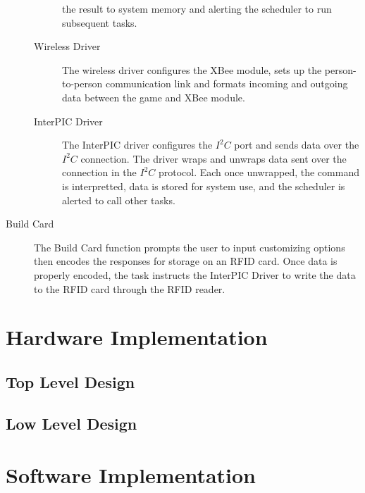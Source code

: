 \documentclass[12pt]{article} %
\begin{document}
\begin{description}
\begin{description}
				the result to system memory and alerting the scheduler to run
				subsequent tasks.
			\item[Wireless Driver] The wireless driver configures the XBee module,
				sets up the person-to-person communication link and formats incoming
				and outgoing data between the game and XBee module.
			\item[InterPIC Driver] The InterPIC driver configures the $I^2C$ port and
				sends data over the $I^2C$ connection. The driver wraps and unwraps
				data sent over the connection in the $I^2C$ protocol. Each once
				unwrapped, the command is interpretted, data is stored for system use,
				and the scheduler is alerted to call other tasks.
		\end{description}
	\item[Build Card] The Build Card function prompts the user to input
		customizing options then encodes the responses for storage on an RFID card.
		Once data is properly encoded, the task instructs the InterPIC Driver to
		write the data to the RFID card through the RFID reader.
\end{description}

\section{Hardware Implementation}\label{hwImplementation} 

\subsection{Top Level Design}\label{hwTopLevel} %

\subsection{Low Level Design}\label{hwLowLevel} %

\section{Software Implementation}\label{swImplementation}
%
%
\end{document}

